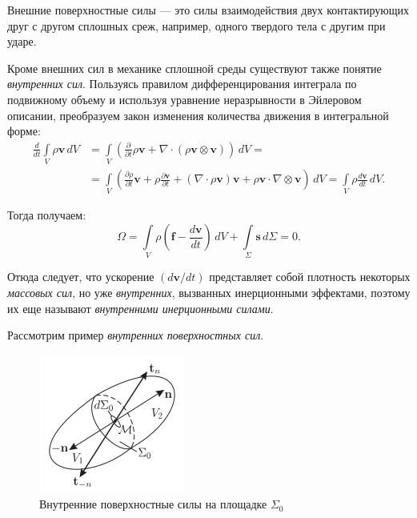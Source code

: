 Внешние поверхностные силы --- это силы взаимодействия двух контактирующих друг с другом сплошных среж, например, одного твердого тела с другим при ударе. 

Кроме внешних сил в механике сплошной среды существуют также понятие \textit{внутренних сил}. Пользуясь правилом дифференцирования интеграла по подвижному объему и используя уравнение неразрывности в Эйлеровом описании, преобразуем закон изменения количества движения в интегральной форме:
\begin{align*}
	\frac{d}{dt} \int\limits_{V} \rho \mathbf{v} \, dV &= \int\limits_{V}\left(\frac{\partial}{\partial t} \rho \mathbf{v} + \nabla \cdot \left(\rho \mathbf{v} \otimes \mathbf{v}\right)\right) \, dV = \\
	&= \int\limits_{V} \left(\frac{\partial \rho}{\partial t} \mathbf{v} + \rho \frac{\partial \mathbf{v}}{\partial t} + (\nabla \cdot \rho \mathbf{v}) \mathbf{v} + \rho \mathbf{v} \cdot \nabla \otimes \mathbf{v}\right) \, dV = \int\limits_{V} \rho \frac{d \mathbf{v}}{d t} \, dV.
\end{align*}

Тогда получаем: 
\begin{equation*}
	\Omega = \int\limits_{V} \rho \left(\mathbf{f} - \frac{d \mathbf{v}}{dt}\right) \, dV + \int\limits_{\Sigma} \mathbf{s} \, d\Sigma = 0.
\end{equation*}

Отюда следует, что ускорение $(d \mathbf{v} / dt)$ представляет собой плотность некоторых \textit{массовых сил}, но уже \textit{внутренних}, вызванных инерционными эффектами, поэтому их еще называют \textit{внутренними инерционными силами}. 

Рассмотрим пример \textit{внутренних поверхностных сил}. 

\begin{figure}
	\centering
	\includegraphics[width=0.7\linewidth]{img/que16}
	\caption{Внутренние поверхностные силы на площадке $\Sigma_0$}
	\label{fig:que16}
\end{figure}


